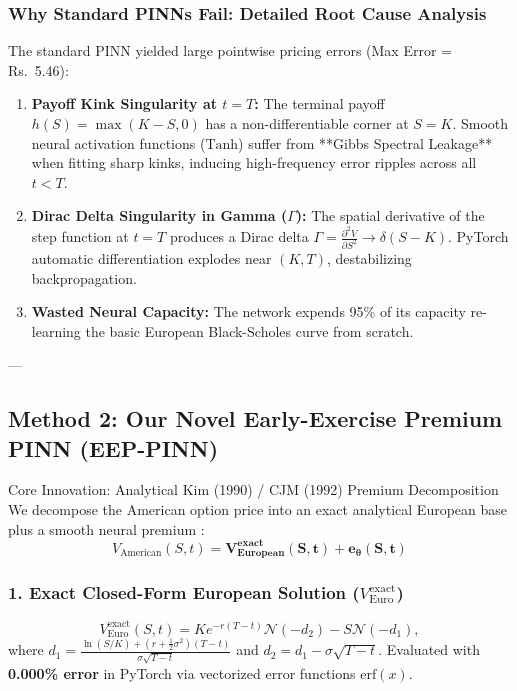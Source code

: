 \documentclass[11pt,a4paper]{article}
\begin{document}
\subsubsection{Why Standard PINNs Fail: Detailed Root Cause Analysis}
The standard PINN yielded large pointwise pricing errors (Max Error = Rs.~5.46):
\begin{enumerate}[leftmargin=1.5em]
    \item \textbf{Payoff Kink Singularity at $t = T$:} The terminal payoff $h(S) = \max(K-S, 0)$ has a non-differentiable corner at $S = K$. Smooth neural activation functions ($\text{Tanh}$) suffer from **Gibbs Spectral Leakage** when fitting sharp kinks, inducing high-frequency error ripples across all $t < T$.
    \item \textbf{Dirac Delta Singularity in Gamma ($\Gamma$):} The spatial derivative of the step function at $t=T$ produces a Dirac delta $\Gamma = \frac{\partial^2 V}{\partial S^2} \to \delta(S-K)$. PyTorch automatic differentiation explodes near $(K, T)$, destabilizing backpropagation.
    \item \textbf{Wasted Neural Capacity:} The network expends 95\% of its capacity re-learning the basic European Black-Scholes curve from scratch.
\end{enumerate}

---

\subsection{Method 2: Our Novel Early-Exercise Premium PINN (EEP-PINN)}

\begin{noveltybox}{Core Innovation: Analytical Kim (1990) / CJM (1992) Premium Decomposition}
We decompose the American option price into an exact analytical European base plus a smooth neural premium \cite{kim1990analytic, carr1992alternative}:
\begin{equation}
\boxed{V_{\text{American}}(S, t) = \mathbf{V_{\text{European}}^{\text{exact}}(S, t)} + \mathbf{e_\theta(S, t)}}
\end{equation}
\end{noveltybox}

\subsubsection{1. Exact Closed-Form European Solution ($V_{\text{Euro}}^{\text{exact}}$)}
\begin{equation}
    V_{\text{Euro}}^{\text{exact}}(S, t) = K e^{-r(T-t)} \mathcal{N}(-d_2) - S \mathcal{N}(-d_1),
\end{equation}
where $d_1 = \frac{\ln(S/K) + (r + \frac{1}{2}\sigma^2)(T-t)}{\sigma\sqrt{T-t}}$ and $d_2 = d_1 - \sigma\sqrt{T-t}$. Evaluated with \textbf{0.000\% error} in PyTorch via vectorized error functions $\text{erf}(x)$.
\end{document}
